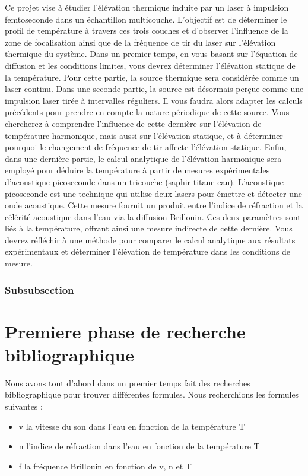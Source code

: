 \documentclass{rapportECC}
\begin{document}
Ce projet vise à étudier l’élévation thermique induite par un laser à impulsion femtoseconde dans un échantillon multicouche. L’objectif est de déterminer le profil de température à travers ces trois couches et d’observer l’influence de la zone de focalisation ainsi que de la fréquence de tir du laser sur l’élévation thermique du système. Dans un premier temps, en vous basant sur l’équation de diffusion et les conditions limites, vous devrez déterminer l’élévation statique de la température. Pour cette partie, la source thermique sera considérée comme un laser continu. Dans une seconde partie, la source est désormais perçue comme une impulsion laser tirée à intervalles réguliers. Il vous faudra alors adapter les calculs précédents pour prendre en compte la nature périodique de cette source. Vous chercherez à comprendre l’influence de cette dernière sur l’élévation de température harmonique, mais aussi sur l’élévation statique, et à déterminer pourquoi le changement de fréquence de tir affecte l’élévation statique. Enfin, dans une dernière partie, le calcul analytique de l’élévation harmonique sera employé pour déduire la température à partir de mesures expérimentales d’acoustique picoseconde dans un tricouche (saphir-titane-eau). L’acoustique picoseconde est une technique qui utilise deux lasers pour émettre et détecter une onde acoustique. Cette mesure fournit un produit entre l’indice de réfraction et la célérité acoustique dans l’eau via la diffusion Brillouin. Ces deux paramètres sont liés à la température, offrant ainsi une mesure indirecte de cette dernière. Vous devrez réfléchir à une méthode pour comparer le calcul analytique aux résultats expérimentaux et déterminer l’élévation de température dans les conditions de mesure.


\subsubsection{Subsubsection}



\section{Premiere phase de recherche bibliographique}

Nous avons tout d’abord dans un premier temps fait des recherches bibliographique pour trouver différentes formules.
Nous recherchions les formules suivantes :

\begin{itemize}
    \item v  la vitesse du son dans l’eau en fonction de la température T
    \item n l’indice de réfraction dans l’eau en fonction de la température T
    \item f la fréquence Brillouin en fonction de v, n et T
\end{itemize}
\end{document}

